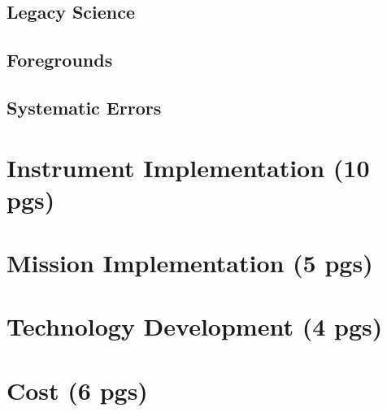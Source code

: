 \documentclass[12pt]{article}
\begin{document}
\subsection{Legacy Science}


\subsection{Foregrounds}


\subsection{Systematic Errors}


\section{Instrument Implementation (10 pgs)}


\section{Mission Implementation (5 pgs)}


\section{Technology Development (4 pgs)}


\section{Cost (6 pgs)}


\newpage




\end{document}
